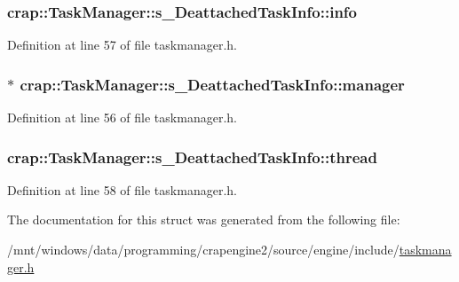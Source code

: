 \subsubsection[{info}]{ crap\+::\+Task\+Manager\+::s\+\_\+\+Deattached\+Task\+Info\+::info}\label{structcrap_1_1_task_manager_1_1s___deattached_task_info_a2fd0482f764c9d4d38b30e29781e5b1b}


Definition at line 57 of file taskmanager.\+h.

\hypertarget{structcrap_1_1_task_manager_1_1s___deattached_task_info_a546d9527f7d1b8f3f9a0eebd83a332a4}{}
\subsubsection[{manager}]{$\ast$ crap\+::\+Task\+Manager\+::s\+\_\+\+Deattached\+Task\+Info\+::manager}\label{structcrap_1_1_task_manager_1_1s___deattached_task_info_a546d9527f7d1b8f3f9a0eebd83a332a4}


Definition at line 56 of file taskmanager.\+h.

\hypertarget{structcrap_1_1_task_manager_1_1s___deattached_task_info_a9e227e898c48d1326f76b0d307cdbf55}{}
\subsubsection[{thread}]{ crap\+::\+Task\+Manager\+::s\+\_\+\+Deattached\+Task\+Info\+::thread}\label{structcrap_1_1_task_manager_1_1s___deattached_task_info_a9e227e898c48d1326f76b0d307cdbf55}


Definition at line 58 of file taskmanager.\+h.



The documentation for this struct was generated from the following file\+:\begin{DoxyCompactItemize}
\item 
/mnt/windows/data/programming/crapengine2/source/engine/include/\hyperlink{taskmanager_8h}{taskmanager.\+h}\end{DoxyCompactItemize}
